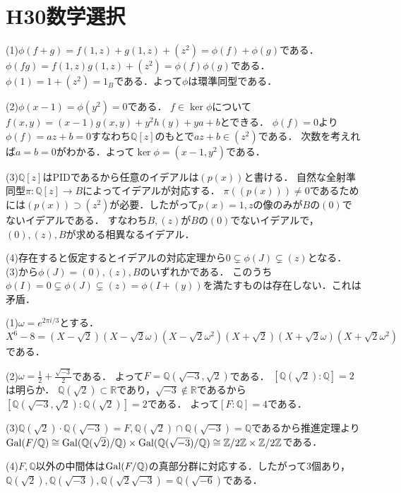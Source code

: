 \documentclass[
		book,
		head_space=20mm,
		foot_space=20mm,
		gutter=10mm,
		line_length=190mm
]{jlreq}
\begin{document}
\section{H30数学選択}
(1)$\phi(f+g)=f(1,z)+g(1,z)+(z^2)=\phi(f)+\phi(g)$である．
$\phi(fg)=f(1,z)g(1,z)+(z^2)=\phi(f)\phi(g)$である．
$\phi(1)=1+(z^2)=1_B$である．よって$\phi$は環準同型である．

(2)$\phi(x-1)=\phi(y^2)=0$である．
$f\in \ker \phi$について$f(x,y)=(x-1)g(x,y)+y^2h(y)+ya+b$とできる．
$\phi(f)=0$より$\phi(f)=az+b=0$すなわち$\mathbb{Q}[z]$のもとで$az+b\in (z^2)$である．
次数を考えれば$a=b=0$がわかる．よって$\ker \phi=(x-1,y^2)$である．

(3)$\mathbb{Q}[z]$はPIDであるから任意のイデアルは$(p(x))$と書ける．
自然な全射準同型$\pi\colon \mathbb{Q}[z]\rightarrow B$によってイデアルが対応する．
$\pi((p(x)))\neq 0$であるためには$(p(x))\supset (z^2)$が必要．したがって$p(x)=1,z$の像のみが$B$の$(0)$でないイデアルである．
すなわち$B,(z)$が$B$の$(0)$でないイデアルで，$(0),(z),B$が求める相異なるイデアル．

(4)存在すると仮定するとイデアルの対応定理から$0\subsetneq \phi(J)\subsetneq (z)$となる．
(3)から$\phi(J)=(0),(z),B$のいずれかである．
このうち$\phi(I)=0\subsetneq \phi(J)\subsetneq (z)=\phi(I+(y))$を満たすものは存在しない．これは矛盾．

(1)$\omega=e^{2\pi i/3}$とする．
$X^6-8=(X-\sqrt{2})(X-\sqrt{2}\omega)(X-\sqrt{2}\omega^2)(X+\sqrt{2})(X+\sqrt{2}\omega)(X+\sqrt{2}\omega^2)$である．

(2)$\omega=\frac{1}{2}+\frac{\sqrt{-3}}{2}$である．
よって$F=\mathbb{Q}(\sqrt{-3},\sqrt{2})$である．
$[\mathbb{Q}(\sqrt{2}):\mathbb{Q}]=2$は明らか．
$\mathbb{Q}(\sqrt{2})\subset \mathbb{R}$であり，$\sqrt{-3}\notin \mathbb{R}$であるから
$[\mathbb{Q}(\sqrt{-3},\sqrt{2}):\mathbb{Q}(\sqrt{2})]=2$である．
よって$[F:\mathbb{Q}]=4$である．

(3)$\mathbb{Q}(\sqrt{2})\cdot\mathbb{Q}(\sqrt{-3})=F,\mathbb{Q}(\sqrt{2})\cap \mathbb{Q}(\sqrt{-3})=\mathbb{Q}$であるから推進定理より
$\mathop{\mathrm{Gal}}(F/\mathbb{Q})\cong \mathop{\mathrm{Gal}}(\mathbb{Q}(\sqrt{2})/\mathbb{Q})\times \mathop{\mathrm{Gal}}(\mathbb{Q}(\sqrt{-3})/\mathbb{Q})\cong \mathbb{Z}/2\mathbb{Z}\times \mathbb{Z}/2\mathbb{Z}$である．

(4)$F,\mathbb{Q}$以外の中間体は$\mathop{\mathrm{Gal}}(F/\mathbb{Q})$の真部分群に対応する．したがって$3$個あり，$\mathbb{Q}(\sqrt{2}),\mathbb{Q}(\sqrt{-3}),\mathbb{Q}(\sqrt{2}\sqrt{-3})=\mathbb{Q}(\sqrt{-6})$である．
\end{document}
